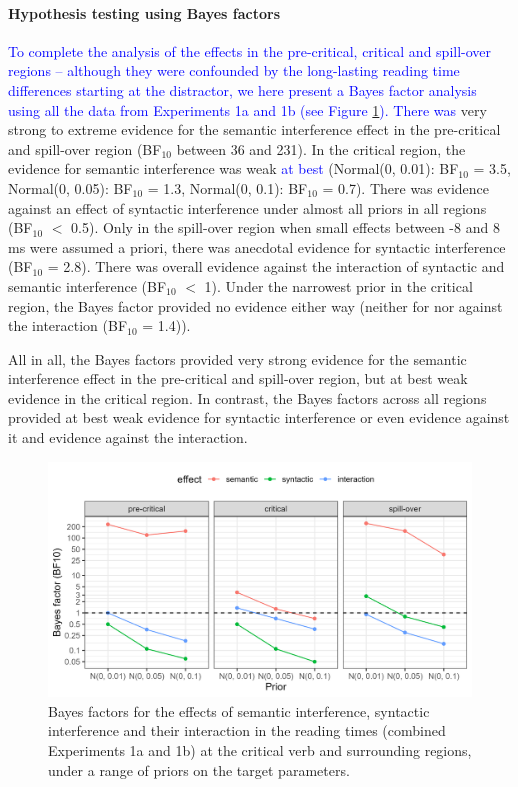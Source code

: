 \documentclass[review,preprint,12pt,authoryear,floatsintext]{elsarticle}
\begin{document}
\paragraph{Hypothesis testing using Bayes factors}
\textcolor{blue}{To complete the analysis of the effects in the pre-critical, critical and spill-over regions -- although they were confounded by the long-lasting reading time differences starting at the distractor, we here present a Bayes factor analysis using all the data from Experiments 1a and 1b (see Figure \ref{fig:spr_bfs}). There was} very strong to extreme evidence for the semantic interference effect in the pre-critical and spill-over region (BF$_{10}$ between 36 and 231). In the critical region, the evidence for semantic interference was weak \textcolor{blue}{at best} (Normal(0, 0.01): BF$_{10}$ = 3.5, Normal(0, 0.05): BF$_{10}$ = 1.3, Normal(0, 0.1): BF$_{10}$ = 0.7). There was evidence against an effect of syntactic interference under almost all priors in all regions (BF$_{10}$ $<$ 0.5). Only in the spill-over region when small effects between -8 and 8 ms were assumed a priori, there was anecdotal evidence for syntactic interference (BF$_{10}$ = 2.8). There was overall evidence against the interaction of syntactic and semantic interference (BF$_{10}$ $<$ 1). Under the narrowest prior in the critical region, the Bayes factor provided no evidence either way (neither for nor against the interaction (BF$_{10}$ = 1.4)).

All in all, the Bayes factors provided very strong evidence for the semantic interference effect in the pre-critical and spill-over region, but at best weak evidence in the critical region. In contrast, the Bayes factors  across all regions provided at best weak evidence for syntactic interference or even evidence against it and evidence against the interaction.

\begin{figure}[ht]
    \caption{Bayes factors for the effects of semantic interference, syntactic interference and their interaction in the reading times (combined Experiments 1a and 1b) at the critical verb and surrounding regions, under a range of priors on the target parameters.}
    \label{fig:spr_bfs}
    \centering
    \includegraphics[width=\textwidth]{BF_plot_spr_774_allregions.png}
\end{figure}
\end{document}
